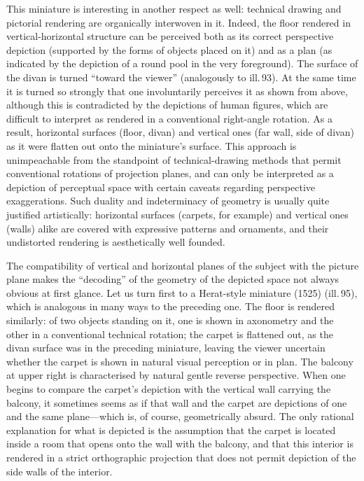 This miniature is interesting in another respect as well: technical drawing and
pictorial rendering are organically interwoven in it. Indeed, the floor rendered in
vertical-horizontal structure can be perceived both as its correct perspective
depiction (supported by the forms of objects placed on it) and as a plan (as
indicated by the depiction of a round pool in the very foreground). The surface of
the divan is turned ``toward the viewer'' (analogously to ill.\,93). At the same
time it is turned so strongly that one involuntarily perceives it as shown from
above, although this is contradicted by the depictions of human figures, which are
difficult to interpret as rendered in a conventional right-angle rotation. As a
result, horizontal surfaces (floor, divan) and vertical ones (far wall, side of
divan) as it were flatten out onto the miniature's surface. This approach is
unimpeachable from the standpoint of technical-drawing methods that permit
conventional rotations of projection planes, and can only be interpreted as a
depiction of perceptual space with certain caveats regarding perspective
exaggerations. Such duality and indeterminacy of geometry is usually quite justified
artistically: horizontal surfaces (carpets, for example) and vertical ones (walls)
alike are covered with expressive patterns and ornaments, and their undistorted
rendering is aesthetically well founded.


The compatibility of vertical and horizontal planes of the subject with the picture
plane makes the ``decoding'' of the geometry of the depicted space not always
obvious at first glance. Let us turn first to a Herat-style miniature (1525)
(ill.\,95), which is analogous in many ways to the preceding one. The floor is
rendered similarly: of two objects standing on it, one is shown in axonometry and
the other in a conventional technical rotation; the carpet is flattened out, as the
divan surface was in the preceding miniature, leaving the viewer uncertain whether
the carpet is shown in natural visual perception or in plan. The balcony at upper
right is characterised by natural gentle reverse perspective. When one begins to
compare the carpet's depiction with the vertical wall carrying the balcony, it
sometimes seems as if that wall and the carpet are depictions of one and the same
plane---which is, of course, geometrically absurd. The only rational explanation
for what is depicted is the assumption that the carpet is located inside a room that
opens onto the wall with the balcony, and that this interior is rendered in a strict
orthographic projection that does not permit depiction of the side walls of the
interior.

